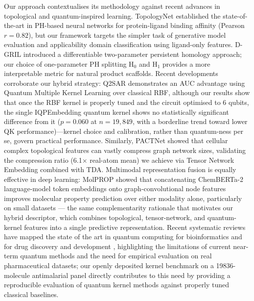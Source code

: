 \documentclass[11pt,a4paper]{article}
\begin{document}
Our approach contextualises its methodology against recent advances in topological and quantum-inspired learning. TopologyNet \citep{topologynet_2018} established the state-of-the-art in PH-based neural networks for protein-ligand binding affinity (Pearson $r = 0.82$), but our framework targets the simpler task of generative model evaluation and applicability domain classification using ligand-only features. D-GRIL \citep{dgril_2026} introduced a differentiable two-parameter persistent homology approach; our choice of one-parameter PH splitting H$_0$ and H$_1$ provides a more interpretable metric for natural product scaffolds. Recent developments corroborate our hybrid strategy: Q2SAR \citep{q2sar_2025} demonstrates an AUC advantage using Quantum Multiple Kernel Learning over classical RBF, although our results show that once the RBF kernel is properly tuned and the circuit optimised to 6 qubits, the single IQPEmbedding quantum kernel shows no statistically significant difference from it ($p = 0.060$ at $n = 19{,}849$, with a borderline trend toward lower QK performance)---kernel choice and calibration, rather than quantum-ness per se, govern practical performance. Similarly, PACTNet \citep{pactnet_2025} showed that cellular complex topological features can vastly compress graph network sizes, validating the compression ratio (\num{6.1}$\times$ real-atom mean) we achieve via Tensor Network Embedding combined with TDA. Multimodal representation fusion is equally effective in deep learning: MolPROP \citep{rollins2024molprop} showed that concatenating ChemBERTa-2 language-model token embeddings onto graph-convolutional node features improves molecular property prediction over either modality alone, particularly on small datasets --- the same complementarity rationale that motivates our hybrid descriptor, which combines topological, tensor-network, and quantum-kernel features into a single predictive representation. Recent systematic reviews have mapped the state of the art in quantum computing for bioinformatics \citep{naleczcharkiewicz2024} and for drug discovery and development \citep{kumar2024quantumdrug}, highlighting the limitations of current near-term quantum methods and the need for empirical evaluation on real pharmaceutical datasets; our openly deposited kernel benchmark on a \num{19836}-molecule antimalarial panel directly contributes to this need by providing a reproducible evaluation of quantum kernel methods against properly tuned classical baselines.

\end{document}
